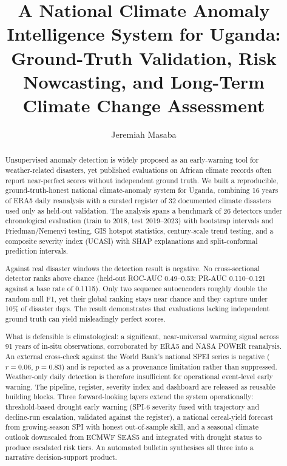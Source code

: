 \documentclass[preprint,12pt]{elsarticle}
\begin{document}
\begin{frontmatter}

\title{A National Climate Anomaly Intelligence System for Uganda:
Ground-Truth Validation, Risk Nowcasting, and Long-Term Climate Change
Assessment}

\author[inst1]{Jeremiah Masaba}


\begin{abstract}
Unsupervised anomaly detection is widely proposed as an early-warning tool for
weather-related disasters, yet published evaluations on African climate records
often report near-perfect scores without independent ground truth. We built a
reproducible, ground-truth-honest national climate-anomaly system for Uganda,
combining 16 years of ERA5 daily reanalysis with a curated register of 32
documented climate disasters used only as held-out validation. The analysis spans
a benchmark of 26 detectors under chronological evaluation (train to 2018, test
2019--2023) with bootstrap intervals and Friedman/Nemenyi testing, GIS hotspot
statistics, century-scale trend testing, and a composite severity index (UCASI)
with SHAP explanations and split-conformal prediction intervals.

Against real disaster windows the detection result is negative. No
cross-sectional detector ranks above chance (held-out ROC-AUC 0.49--0.53;
PR-AUC 0.110--0.121 against a base rate of 0.1115). Only two sequence
autoencoders roughly double the random-null F1, yet their global ranking stays
near chance and they capture under 10\% of disaster days. The result
demonstrates that evaluations lacking independent ground truth can yield
misleadingly perfect scores.

What is defensible is climatological: a significant, near-universal warming
signal across 91 years of in-situ observations, corroborated by ERA5 and NASA
POWER reanalysis. An external cross-check against the World Bank's national SPEI
series is negative ($r=0.06$, $p=0.83$) and is reported as a provenance
limitation rather than suppressed. Weather-only daily detection is therefore
insufficient for operational event-level early warning. The pipeline, register,
severity index and dashboard are released as reusable building blocks.
Three forward-looking layers extend the system operationally: threshold-based
drought early warning (SPI-6 severity fused with trajectory and decline-run
escalation, validated against the register), a national cereal-yield forecast
from growing-season SPI with honest out-of-sample skill, and a seasonal climate
outlook downscaled from ECMWF SEAS5 and integrated with drought status to
produce escalated risk tiers. An automated bulletin synthesises all three into
a narrative decision-support product.
\end{abstract}


\end{frontmatter}
\end{document}
